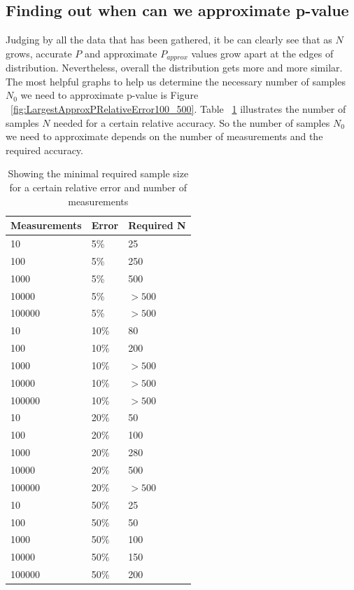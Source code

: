 \documentclass[12pt]{article}
\begin{document}
\subsection{Finding out when can we approximate p-value}
Judging by all the data that has been gathered, it be can clearly see that as $N$ grows, accurate $P$ and approximate $P_{approx}$ values grow apart at the edges of distribution. Nevertheless, overall the distribution gets more and more similar. The most helpful graphs to help us determine the necessary number of samples $N_0$ we need to approximate p-value is Figure ~\ref{fig:LargestApproxPRelativeError100_500}. Table ~\ref{table:requiredN} illustrates the number of samples $N$ needed for a certain relative accuracy. So the number of samples $N_0$ we need to approximate depends on the number of measurements and the required accuracy.

\begin{table}[H]
	\begin{center}
		\caption{Showing the minimal required sample size for a certain relative error and number of measurements}
	    \begin{tabular}{| l | l | l |}
	    \hline
		Measurements & Error & Required N \\
		\hline
		10 & 5\% & 25 \\
    \hline
		100 & 5\% & 250 \\
    \hline
		1000 & 5\% & 500 \\
    \hline
		10000 & 5\% & $>500$ \\
    \hline
		100000 & 5\% & $> 500$ \\
    \hline
		\hline
		10  & 10\% & 80 \\
    \hline
		100 & 10\% & 200 \\
    \hline
		1000 & 10\% & $>500$ \\
    \hline
		10000 & 10\% & $>500$ \\
    \hline
		100000  & 10\% & $>500$ \\
		\hline
    \hline
		10  & 20\% & 50 \\
    \hline
		100 & 20\% & 100 \\
    \hline
		1000  & 20\% & 280 \\
    \hline
		10000  & 20\% & 500 \\
    \hline
		100000  & 20\% & $>500$ \\
    \hline
    \hline
		10  & 50\% &  25 \\
    \hline
		100 & 50\% & 50 \\
    \hline
		1000 & 50\% & 100 \\
    \hline
		10000 & 50\% & 150 \\
    \hline
		100000 & 50\% & 200 \\
		\hline
		\end{tabular}
		\label{table:requiredN}
	\end{center}
\end{table}
\end{document}
